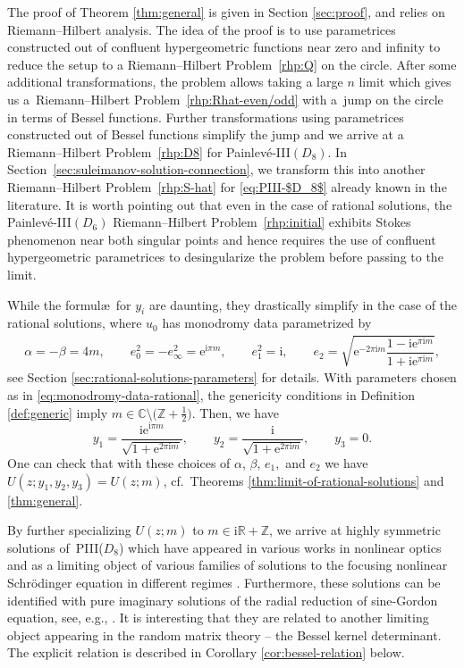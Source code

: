 \documentclass[pdftex]{sigma}
\numberwithin{equation}{section}
\newcommand{\ee}{\mathrm{e}}
\newcommand{\ii}{\mathrm{i}}
\newcommand{\R}{{\mathbb{R}}}
\newcommand{\C}{{\mathbb{C}}}
\newcommand{\Z}{{\mathbb{Z}}}
\begin{document}
The proof of Theorem \ref{thm:general} is given in Section \ref{sec:proof}, and relies on Riemann--Hilbert analysis. The idea of the proof is to use parametrices constructed out of confluent hypergeometric functions near zero and infinity to reduce the setup to a Riemann--Hilbert Problem~\ref{rhp:Q} on the circle. After some additional transformations, the problem allows taking a large $n$ limit which gives us a~Riemann--Hilbert Problem~\ref{rhp:Rhat-even/odd} with a~jump on the circle in terms of Bessel functions. Further transformations using parametrices constructed out of Bessel functions simplify the jump and we arrive at a Riemann--Hilbert Problem~\ref{rhp:D8} for Painlev\'e-III$(D_8)$. In Section~\ref{sec:suleimanov-solution-connection}, we transform this into another Riemann--Hilbert Problem~\ref{rhp:S-hat} for \eqref{eq:PIII-$D_8$} already known in the literature. It is worth pointing out that even in the case of rational solutions, the Painlev\'e-III$(D_6)$ Riemann--Hilbert Problem~\ref{rhp:initial} exhibits Stokes phenomenon near both singular points \cite{BMS18} and hence requires the use of confluent hypergeometric parametrices to desingularize the problem before passing to the limit.

While the formul\ae\ for $y_i$ are daunting, they drastically simplify in the case of the rational solutions, where $u_0$ has monodromy data parametrized by
\begin{gather}
 \alpha = -\beta = 4m, \qquad e_0^2 = -e_\infty^2 = \ee^{\ii \pi m},\qquad
 e_1^2 = \ii, \qquad
 e_2 = \sqrt{\ee^{-2\pi \ii m}\dfrac{1 - \ii \ee^{\pi \ii m}}{1 + \ii \ee^{\pi \ii m}}},
\label{eq:monodromy-data-rational}
\end{gather}
see Section \ref{sec:rational-solutions-parameters} for details. With parameters chosen as in \eqref{eq:monodromy-data-rational}, the genericity conditions in Definition \ref{def:generic} imply $m \in \C \setminus \big(\Z + \frac{1}{2}\big)$. Then, we have
\[
y_1 = \frac{\ii \ee^{\ii\pi m}}{\sqrt{1+ \ee^{2\pi \ii m}}}, \qquad y_2 = \frac{\ii }{\sqrt{1+ \ee^{2\pi \ii m}}}, \qquad y_3 = 0.
\]
One can check that with these choices of $\alpha$, $\beta$, $e_1,$ and $e_2$ we have $U(z;y_1,y_2,y_3) = U(z;m)$, cf.\ Theorems \ref{thm:limit-of-rational-solutions} and \ref{thm:general}.

By further specializing $U(z;m)$ to $m \in \ii\R+ \Z$, we arrive at highly symmetric solutions of~PIII($D_8$) which have appeared in various works in nonlinear optics \cite{suleimanov} and as a limiting object of various families of solutions to the focusing nonlinear Schr\"odinger equation in different regimes \cite{MR4007631, BLM20}. Furthermore, these solutions can be identified with pure imaginary solutions of the radial reduction of sine-Gordon equation, see, e.g., \cite[Chapter 13]{FIKN}. It is interesting that they are related to another limiting object appearing in the random matrix theory -- the Bessel kernel determinant. The explicit relation is described in Corollary \ref{cor:bessel-relation} below.
\end{document}
